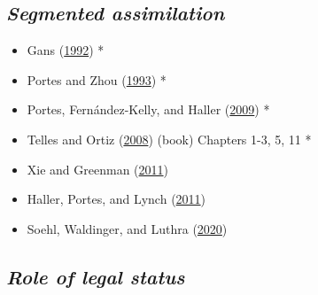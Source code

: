 \documentclass[
]{article}
\providecommand{\tightlist}{%
  \setlength{\itemsep}{0pt}\setlength{\parskip}{0pt}}
\begin{document}
\hypertarget{segmented-assimilation}{%
\subsection{\texorpdfstring{\emph{Segmented
assimilation}}{Segmented assimilation}}\label{segmented-assimilation}}

\begin{itemize}
\tightlist
\item
  Gans (\protect\hyperlink{ref-gans1992second}{1992}) *
\item
  Portes and Zhou (\protect\hyperlink{ref-portes1993new}{1993}) *
\item
  Portes, Fernández-Kelly, and Haller
  (\protect\hyperlink{ref-portes2009adaptation}{2009}) *
\item
  Telles and Ortiz (\protect\hyperlink{ref-telles2008generations}{2008})
  (book) Chapters 1-3, 5, 11 *
\item
  Xie and Greenman (\protect\hyperlink{ref-xie2011social}{2011})
\item
  Haller, Portes, and Lynch
  (\protect\hyperlink{ref-haller2011dreams}{2011})
\item
  Soehl, Waldinger, and Luthra
  (\protect\hyperlink{ref-soehl2020social}{2020})
\end{itemize}

\hypertarget{role-of-legal-status}{%
\subsection{\texorpdfstring{\emph{Role of legal
status}}{Role of legal status}}\label{role-of-legal-status}}
\end{document}
